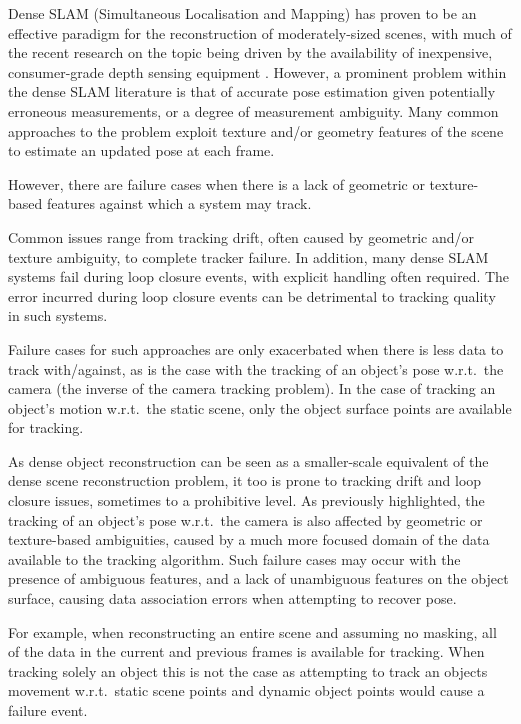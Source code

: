 Dense SLAM (Simultaneous Localisation and Mapping) has proven to be an effective paradigm for the reconstruction of moderately-sized scenes,
with much of the recent research on the topic being driven by the availability of inexpensive, consumer-grade depth sensing equipment \cite{Newcombe2011,Niessner2013,Prisacariu2014}. 
However, a prominent problem within the dense SLAM literature is that of accurate pose estimation given potentially erroneous measurements, or a degree of measurement ambiguity. Many common approaches\cite{Besl1992,Levoy2001} to the problem exploit texture and/or geometry features of the scene to estimate an updated pose at each frame.

However, there are failure cases when there is a lack of geometric or texture-based features against which a system may track. 

Common issues range from tracking drift, often caused by geometric and/or texture ambiguity, to complete tracker failure. In addition, many dense 
SLAM systems fail during loop closure events, with explicit handling often required. The error incurred during loop closure events can be detrimental 
to tracking quality in such systems. 

Failure cases for such approaches are only exacerbated when there is less data to track with/against, as is the case with the tracking of an 
object's pose w.r.t.\ the camera (the inverse of the camera tracking problem). In the case of tracking an object's motion w.r.t.\ the static 
scene, only the object surface points are available for tracking.

As dense object reconstruction can be seen as a smaller-scale equivalent of the dense scene reconstruction problem, it too is prone to 
tracking drift and loop closure issues, sometimes to a prohibitive level. As previously highlighted, the tracking of an object's pose w.r.t.\ the camera 
is also affected by geometric or texture-based ambiguities, caused by a much more focused domain of the data available to the tracking algorithm. 
Such failure cases may occur with the presence of ambiguous features, and a lack of unambiguous features on the object surface, causing data 
association errors when attempting to recover pose.

For example, when reconstructing an entire scene and assuming no masking, all of the data in the current and previous frames is available for tracking. When tracking solely an object this is not the case as attempting to track an objects movement w.r.t.\ static scene points and dynamic object points would cause a failure event.

